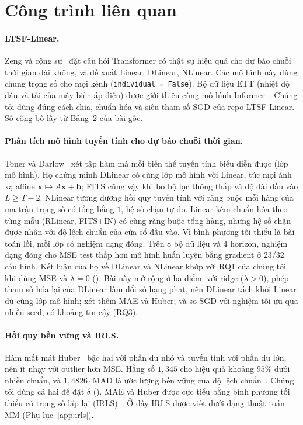 \section{Công trình liên quan}
\label{sec:related}

\paragraph{LTSF-Linear.} Zeng và cộng sự~\cite{zeng2023transformers} đặt câu hỏi Transformer có thật sự hiệu quả cho dự báo chuỗi thời gian dài không, và đề xuất Linear, DLinear, NLinear. Các mô hình này dùng chung trọng số cho mọi kênh (\texttt{individual = False}). Bộ dữ liệu ETT (nhiệt độ dầu và tải của máy biến áp điện) được giới thiệu cùng mô hình Informer~\cite{zhou2021informer}. Chúng tôi dùng đúng cách chia, chuẩn hóa và siêu tham số SGD của repo LTSF-Linear. Số công bố lấy từ Bảng~2 của bài gốc.

\paragraph{Phân tích mô hình tuyến tính cho dự báo chuỗi thời gian.} Toner và Darlow~\cite{toner2024analysis} xét tập hàm mà mỗi biến thể tuyến tính biểu diễn được (lớp mô hình). Họ chứng minh DLinear có cùng lớp mô hình với Linear, tức mọi ánh xạ affine $\mathbf{x} \mapsto A\mathbf{x} + \mathbf{b}$; FITS cũng vậy khi bỏ bộ lọc thông thấp và độ dài đầu vào $L \ge T - 2$. NLinear tương đương hồi quy tuyến tính với ràng buộc mỗi hàng của ma trận trọng số có tổng bằng $1$, hệ số chặn tự do. Linear kèm chuẩn hóa theo từng mẫu (RLinear, FITS+IN) có cùng ràng buộc tổng hàng, nhưng hệ số chặn được nhân với độ lệch chuẩn của cửa sổ đầu vào. Vì bình phương tối thiểu là bài toán lồi, mỗi lớp có nghiệm dạng đóng. Trên 8 bộ dữ liệu và 4 horizon, nghiệm dạng đóng cho MSE test thấp hơn mô hình huấn luyện bằng gradient ở 23/32 cấu hình. Kết luận của họ về DLinear và NLinear khớp với RQ1 của chúng tôi khi dùng MSE và $\lambda = 0$ (). Bài này mở rộng ở ba điểm: với ridge ($\lambda > 0$), phép tham số hóa lại của DLinear làm đổi số hạng phạt, nên DLinear tách khỏi Linear dù cùng lớp mô hình; xét thêm MAE và Huber; và so SGD với nghiệm tối ưu qua nhiều seed, có khoảng tin cậy (RQ3).

\paragraph{Hồi quy bền vững và IRLS.} Hàm mất mát Huber~\cite{huber1964robust} bậc hai với phần dư nhỏ và tuyến tính với phần dư lớn, nên ít nhạy với outlier hơn MSE. Hằng số $1{,}345$ cho hiệu quả khoảng $95\%$ dưới nhiễu chuẩn, và $1{,}4826 \cdot \mathrm{MAD}$ là ước lượng bền vững của độ lệch chuẩn~\cite{huber2009robust}. Chúng tôi dùng cả hai để đặt $\delta$ (). MAE và Huber được cực tiểu bằng bình phương tối thiểu có trọng số lặp lại (IRLS)~\cite{holland1977robust}. Ở đây IRLS được viết dưới dạng thuật toán MM (Phụ lục~\ref{app:irls}).

